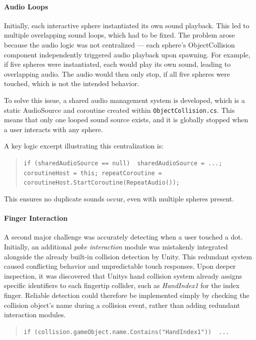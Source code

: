\paragraph{Audio Loops} 
Initially, each interactive sphere instantiated its own sound playback. This led to multiple overlapping sound loops, which had to be fixed. The problem arose because the audio logic was not centralized — each sphere's ObjectCollision component independently triggered audio playback upon spawning. For example, if five spheres were instantiated, each would play its own sound, leading to overlapping audio. The audio would then only stop, if all five spheres were touched, which is not the intended behavior.

\vspace{1em}

To solve this issue, a shared audio management system is developed, which is a static AudioSource and coroutine created within \texttt{ObjectCollision.cs}. This means that only one looped sound source exists, and it is globally stopped when a user interacts with any sphere.

A key logic excerpt illustrating this centralization is:

\begin{quote} \small \texttt{if (sharedAudioSource == null) { sharedAudioSource = ...; coroutineHost = this; repeatCoroutine = coroutineHost.StartCoroutine(RepeatAudio());}} \end{quote}

This ensures no duplicate sounds occur, even with multiple spheres present.

\paragraph{Finger Interaction} 
A second major challenge was accurately detecting when a user touched a dot. Initially, an additional \textit{poke interaction} module was mistakenly integrated alongside the already built-in collision detection by Unity. This redundant system caused conflicting behavior and unpredictable touch responses. Upon deeper inspection, it was discovered that Unitys hand collision system already assigns specific identifiers to each fingertip collider, such as \textit{HandIndex1} for the index finger. Reliable detection could therefore be implemented simply by checking the collision object's name during a collision event, rather than adding redundant interaction modules.

\begin{quote} \small \texttt{if (collision.gameObject.name.Contains("HandIndex1")) { ... }} \end{quote}


